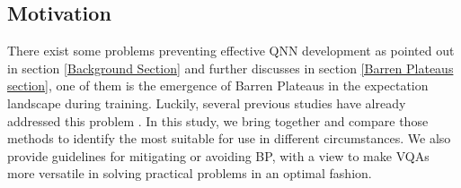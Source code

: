 \subsection{Motivation}
There exist some problems preventing effective QNN development as pointed out in section \ref{Background Section} and further discusses in section \ref{Barren Plateaus section}, one of them is the emergence of Barren Plateaus in the expectation landscape during training.
Luckily, several previous studies have already addressed this problem \cite{cerezoCostFunctionDependent2021,skolikLayerwiseLearningQuantum2021,grantInitializationStrategyAddressing2019}.
In this study, we bring together and compare those methods to identify the most suitable for use in different circumstances.
We also provide guidelines for mitigating or avoiding BP, with a view to make VQAs more versatile in solving practical problems in an optimal fashion.